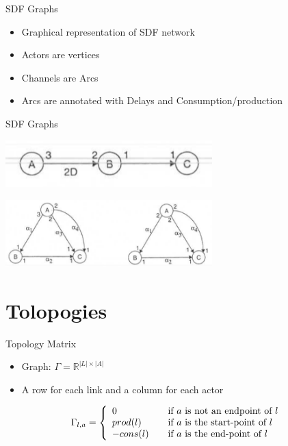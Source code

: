 \documentclass{beamer}
\begin{document}
\begin{frame}{SDF Graphs}
\begin{itemize}
	\item Graphical representation of SDF network
	\item Actors are vertices
	\item Channels are Arcs
	\item Arcs are annotated with Delays and Consumption/production
\end{itemize}
\end{frame}


\begin{frame}{SDF Graphs}
\begin{center}
	\includegraphics[width=8cm]{../res/simplesdf.png}

	\includegraphics[width=8cm]{../res/validinvalid.png}

	\cite{sdfbook}
\end{center}
\end{frame}

\section{Tolopogies}

\begin{frame}{Topology Matrix}\
\begin{itemize}
	\item Graph: $\Gamma = \mathbb{R}^{|L| \times |A|}$
	\item A row for each link and a column for each actor
\end{itemize}

\[
  \Gamma_{l, a} = \left\{
  \begin{array}{l l}
    0 & \quad \text{if $a$ is not an endpoint of $l$}\\
    prod(l) & \quad \text{if $a$ is the start-point of $l$}\\
    -cons(l) & \quad \text{if $a$ is the end-point of $l$}
  \end{array} \right.
\]\
\end{frame}
\end{document}
